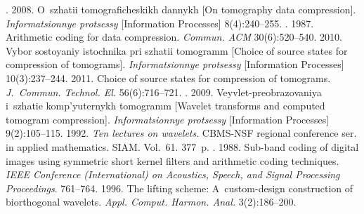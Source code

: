 






  \begin{multicols}{2}

\renewcommand{\bibname}{\protect\rmfamily References}

{\small\frenchspacing
 {%
 \begin{thebibliography}{9}
. 2008. 
O~szhatii tomograficheskikh dannykh [On tomography data compression]. 
\textit{Informatsionnye protsessy} [Information Processes] 8(4):240--255.
. 1987. 
Arithmetic coding for data compression. \textit{Commun. ACM} 30(6):520--540.
 2010. Vybor sostoyaniy istochnika pri szhatii tomogramm 
[Choice of source states for compression of tomograms]. 
\textit{Informatsionnye protsessy} [Information Processes] 10(3):237--244.
 2011. Choice of source states for compression of tomograms. 
\textit{J.~Commun. Technol. El.} 56(6):716--721.
. 2009. Veyvlet-preobrazovaniya 
i~szhatie komp'yuternykh tomogramm [Wavelet transforms and computed tomogram 
compression]. \textit{Informatsionnye protsessy} [Information Processes] 9(2):105--115.
 1992.
\textit{Ten lectures on wavelets}. 
CBMS-NSF regional conference ser. in applied mathematics. SIAM. Vol.~61. 377~p.
. 1988. 
Sub-band coding of digital images using symmetric short kernel filters 
and arithmetic coding techniques. 
\textit{IEEE Conference (International) on Acoustics,  Speech,
and Signal Processing Proceedings}. 761--764.
 1996. The lifting scheme: 
A~custom-design construction of biorthogonal wavelets. 
\textit{Appl. Comput. Harmon. Anal.} 3(2):186--200.
\end{thebibliography}

 }
 }

\end{multicols}

